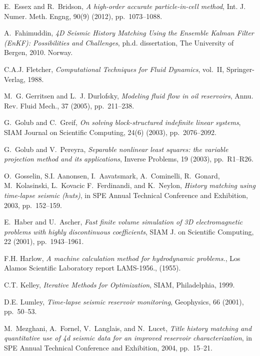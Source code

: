 \documentclass[english]{siamltex}
\begin{document}
\begin{thebibliography}{10}
{\sc E.~Essex and R.~Bridson}, {\em A high-order accurate particle-in-cell
  method}, Int. J. Numer. Meth. Engng, 90(9) (2012), pp.~1073--1088.

{\sc A.~Fahimuddin}, {\em 4D Seismic History Matching Using the Ensemble Kalman
  Filter (EnKF): Possibilities and Challenges}, ph.d. dissertation, The
  University of Bergen, 2010.
\newblock Norway.

{\sc C.A.J. Fletcher}, {\em Computational Techniques for Fluid Dynamics},
  vol.~II, Springer-Verlag, 1988.

{\sc M.~G. Gerritsen and L.~J. Durlofsky}, {\em {Modeling fluid flow in oil
  reservoirs}}, Annu. Rev. Fluid Mech., 37 (2005), pp.~211--238.

{\sc G.~Golub and C.~Greif}, {\em On solving block-structured indefinite linear
  systems}, SIAM Journal on Scientific Computing, 24(6) (2003), pp.~2076--2092.

{\sc G.~Golub and V.~Pereyra}, {\em Separable nonlinear least squares: the
  variable projection method and its applications}, Inverse Problems, 19
  (2003), pp.~R1--R26.

{\sc O.~Gosselin, S.I. Aanonsen, I.~Aavatsmark, A.~Cominelli, R.~Gonard,
  M.~Kolasinski, L.~Kovacic F.~Ferdinandi, and K.~Neylon}, {\em History
  matching using time-lapse seismic (huts)}, in SPE Annual Technical Conference
  and Exhibition, 2003, pp.~152--159.

{\sc E.~Haber and U.~Ascher}, {\em Fast finite volume simulation of 3{D}
  electromagnetic problems with highly discontinuous coefficients}, SIAM J. on
  Scientific Computing, 22 (2001), pp.~1943--1961.

{\sc F.H. Harlow}, {\em A machine calculation method for hydrodynamic
  problems.}, Los Alamos Scientific Laboratory report LAMS-1956.,  (1955).

{\sc C.T. Kelley}, {\em Iterative Methods for Optimization}, SIAM,
  Philadelphia, 1999.

{\sc D.E. Lumley}, {\em {Time-lapse seismic reservoir monitoring}}, Geophysics,
  66 (2001), pp.~50--53.

{\sc M.~Mezghani, A.~Fornel, V.~Langlais, and N.~Lucet}, {\em Title history
  matching and quantitative use of 4d seismic data for an improved reservoir
  characterization}, in SPE Annual Technical Conference and Exhibition, 2004,
  pp.~15--21.


\end{thebibliography}
\end{document}
